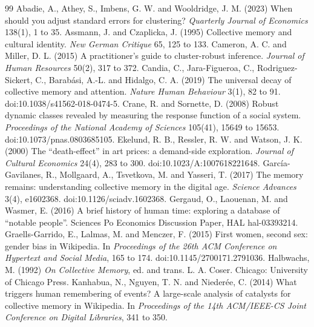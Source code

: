 \documentclass[11pt,a4paper]{article}
\begin{document}
\begin{thebibliography}{99}
 Abadie, A., Athey, S., Imbens, G. W. and Wooldridge, J. M. (2023) When should you adjust standard errors for clustering? \textit{Quarterly Journal of Economics} 138(1), 1 to 35.
 Assmann, J. and Czaplicka, J. (1995) Collective memory and cultural identity. \textit{New German Critique} 65, 125 to 133.
 Cameron, A. C. and Miller, D. L. (2015) A practitioner's guide to cluster-robust inference. \textit{Journal of Human Resources} 50(2), 317 to 372.
 Candia, C., Jara-Figueroa, C., Rodriguez-Sickert, C., Barabási, A.-L. and Hidalgo, C. A. (2019) The universal decay of collective memory and attention. \textit{Nature Human Behaviour} 3(1), 82 to 91. doi:10.1038/s41562-018-0474-5.
 Crane, R. and Sornette, D. (2008) Robust dynamic classes revealed by measuring the response function of a social system. \textit{Proceedings of the National Academy of Sciences} 105(41), 15649 to 15653. doi:10.1073/pnas.0803685105.
 Ekelund, R. B., Ressler, R. W. and Watson, J. K. (2000) The ``death-effect'' in art prices: a demand-side exploration. \textit{Journal of Cultural Economics} 24(4), 283 to 300. doi:10.1023/A:1007618221648.
 García-Gavilanes, R., Mollgaard, A., Tsvetkova, M. and Yasseri, T. (2017) The memory remains: understanding collective memory in the digital age. \textit{Science Advances} 3(4), e1602368. doi:10.1126/sciadv.1602368.
 Gergaud, O., Laouenan, M. and Wasmer, E. (2016) A brief history of human time: exploring a database of ``notable people''. Sciences Po Economics Discussion Paper, HAL hal-03393214.
 Graells-Garrido, E., Lalmas, M. and Menczer, F. (2015) First women, second sex: gender bias in Wikipedia. In \textit{Proceedings of the 26th ACM Conference on Hypertext and Social Media}, 165 to 174. doi:10.1145/2700171.2791036.
 Halbwachs, M. (1992) \textit{On Collective Memory}, ed. and trans. L. A. Coser. Chicago: University of Chicago Press.
 Kanhabua, N., Nguyen, T. N. and Niederée, C. (2014) What triggers human remembering of events? A large-scale analysis of catalysts for collective memory in Wikipedia. In \textit{Proceedings of the 14th ACM/IEEE-CS Joint Conference on Digital Libraries}, 341 to 350.

\end{thebibliography}
\end{document}
